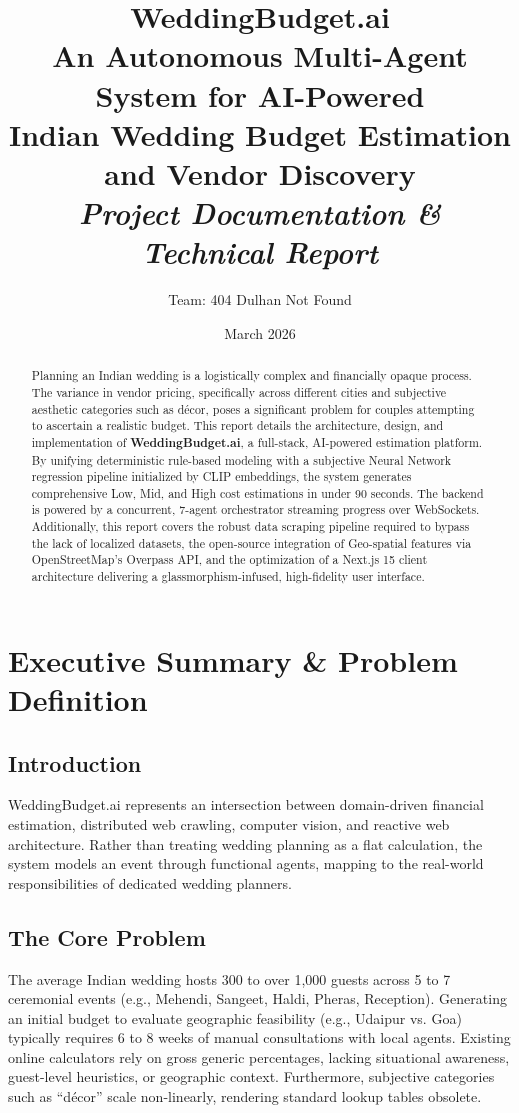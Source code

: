 \documentclass[11pt, a4paper]{report}
\title{
    \textbf{\Huge WeddingBudget.ai}\\[1em]
    \Large An Autonomous Multi-Agent System for AI-Powered\\Indian Wedding Budget Estimation and Vendor Discovery\\[2em]
    \large \textit{Project Documentation \& Technical Report}
}
\author{Team: 404 Dulhan Not Found}
\date{March 2026}
\begin{document}
\maketitle

\begin{abstract}
Planning an Indian wedding is a logistically complex and financially opaque process. The variance in vendor pricing, specifically across different cities and subjective aesthetic categories such as décor, poses a significant problem for couples attempting to ascertain a realistic budget. This report details the architecture, design, and implementation of \textbf{WeddingBudget.ai}, a full-stack, AI-powered estimation platform. By unifying deterministic rule-based modeling with a subjective Neural Network regression pipeline initialized by CLIP embeddings, the system generates comprehensive Low, Mid, and High cost estimations in under 90 seconds. The backend is powered by a concurrent, 7-agent orchestrator streaming progress over WebSockets. Additionally, this report covers the robust data scraping pipeline required to bypass the lack of localized datasets, the open-source integration of Geo-spatial features via OpenStreetMap's Overpass API, and the optimization of a Next.js 15 client architecture delivering a glassmorphism-infused, high-fidelity user interface.
\end{abstract}

\tableofcontents
\newpage

\chapter{Executive Summary \& Problem Definition}

\section{Introduction}
WeddingBudget.ai represents an intersection between domain-driven financial estimation, distributed web crawling, computer vision, and reactive web architecture. Rather than treating wedding planning as a flat calculation, the system models an event through functional agents, mapping to the real-world responsibilities of dedicated wedding planners. 

\section{The Core Problem}
The average Indian wedding hosts 300 to over 1,000 guests across 5 to 7 ceremonial events (e.g., Mehendi, Sangeet, Haldi, Pheras, Reception). Generating an initial budget to evaluate geographic feasibility (e.g., Udaipur vs. Goa) typically requires 6 to 8 weeks of manual consultations with local agents. Existing online calculators rely on gross generic percentages, lacking situational awareness, guest-level heuristics, or geographic context. Furthermore, subjective categories such as ``décor'' scale non-linearly, rendering standard lookup tables obsolete.
\end{document}

